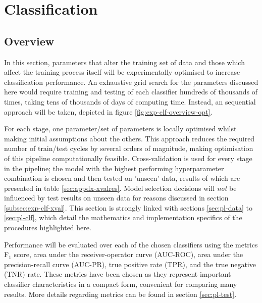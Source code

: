 \section{Classification}
\label{sec:exp-clf}
    \subsection{Overview}
    \label{subsec:exp-clf-overview}
        In this section, parameters that alter the training set of data and those which affect the training process itself will be experimentally optimised to increase classification performance. An exhaustive grid search for the parameters discussed here would require training and testing of each classifier hundreds of thousands of times, taking tens of thousands of days of computing time. Instead, an sequential approach will be taken, depicted in figure \ref{fig:exp-clf-overview-opt}. 
        
        For each stage, one parameter/set of parameters is locally optimised whilst making initial assumptions about the others. 
        This approach reduces the required number of train/test cycles by several orders of magnitude, making optimisation of this pipeline computationally feasible. Cross-validation is used for every stage in the pipeline; the model with the highest performing hyperparameter combination is chosen and then tested on 'unseen' data, results of which are presented in table \ref{sec:appdx-xvalres}. Model selection decisions will \textit{not} be influenced by test results on unseen data for reasons discussed in section \ref{subsec:exp-clf-xval}. This section is strongly linked with sections \ref{sec:pl-data} to \ref{sec:pl-clf}, which detail the mathematics and implementation specifics of the procedures highlighted here.
        
        Performance will be evaluated over each of the chosen classifiers using the metrics F$_{1}$ score, area under the receiver-operator curve (AUC-ROC), area under the precision-recall curve (AUC-PR), true positive rate (TPR), and the true negative (TNR) rate. These metrics have been chosen as they represent important classifier characteristics in a compact form, convenient for comparing many results. More details regarding metrics can be found in section \ref{sec:pl-test}. 

